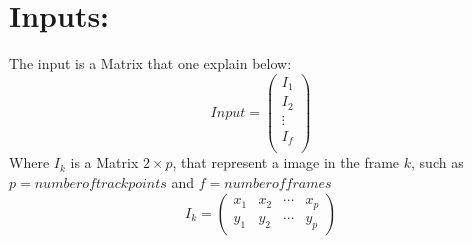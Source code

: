 \section{Inputs:}
The input is a Matrix that one explain below:
\begin{equation}
Input=
\begin{pmatrix}
I_{1}\\
I_{2}\\
\vdots\\
I_{f}\\
\end{pmatrix}
\end{equation}
Where $I_{k}$ is a Matrix $2\times p$, that represent a image in the frame $k$, such as $p=number of track points$ and $f=number of frames$
\begin{equation}
I_{k}=
\begin{pmatrix}
x_{1} & x_{2} & \cdots & x_{p}\\
y_{1} & y_{2} & \cdots & y_{p}
\end{pmatrix}
\end{equation}